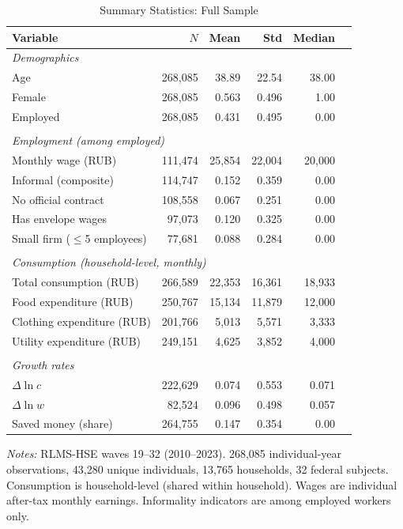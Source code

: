 \documentclass[12pt]{article}
\begin{document}
\begin{table}[htbp]
\centering
\caption{Summary Statistics: Full Sample}
\label{tab:summary_full}
\small
\begin{tabular}{lrrrrr}
\toprule
Variable & $N$ & Mean & Std & Median \\
\midrule
\multicolumn{5}{l}{\textit{Demographics}} \\
Age & 268,085 & 38.89 & 22.54 & 38.00 \\
Female & 268,085 & 0.563 & 0.496 & 1.00 \\
Employed & 268,085 & 0.431 & 0.495 & 0.00 \\
\\
\multicolumn{5}{l}{\textit{Employment (among employed)}} \\
Monthly wage (RUB) & 111,474 & 25,854 & 22,004 & 20,000 \\
Informal (composite) & 114,747 & 0.152 & 0.359 & 0.00 \\
No official contract & 108,558 & 0.067 & 0.251 & 0.00 \\
Has envelope wages & 97,073 & 0.120 & 0.325 & 0.00 \\
Small firm ($\leq$5 employees) & 77,681 & 0.088 & 0.284 & 0.00 \\
\\
\multicolumn{5}{l}{\textit{Consumption (household-level, monthly)}} \\
Total consumption (RUB) & 266,589 & 22,353 & 16,361 & 18,933 \\
Food expenditure (RUB) & 250,767 & 15,134 & 11,879 & 12,000 \\
Clothing expenditure (RUB) & 201,766 & 5,013 & 5,571 & 3,333 \\
Utility expenditure (RUB) & 249,151 & 4,625 & 3,852 & 4,000 \\
\\
\multicolumn{5}{l}{\textit{Growth rates}} \\
$\Delta \ln c$ & 222,629 & 0.074 & 0.553 & 0.071 \\
$\Delta \ln w$ & 82,524 & 0.096 & 0.498 & 0.057 \\
Saved money (share) & 264,755 & 0.147 & 0.354 & 0.00 \\
\bottomrule
\end{tabular}
\begin{minipage}{0.9\textwidth}
\vspace{0.3em}
\footnotesize \textit{Notes:} RLMS-HSE waves 19--32 (2010--2023). 268,085 individual-year observations, 43,280 unique individuals, 13,765 households, 32 federal subjects. Consumption is household-level (shared within household). Wages are individual after-tax monthly earnings. Informality indicators are among employed workers only.
\end{minipage}
\end{table}
\end{document}
